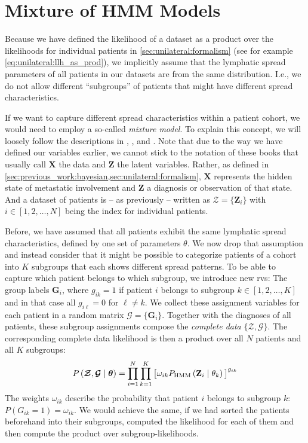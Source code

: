 \documentclass[\relativeRoot/main.tex]{subfiles}
\begin{document}
\section{Mixture of HMM Models}
\label{sec:future:mixture}

Because we have defined the likelihood of a dataset as a product over the likelihoods for individual patients in \cref{sec:unilateral:formalism} (see for example \cref{eq:unilateral:llh_as_prod}), we implicitly assume that the lymphatic spread parameters of all patients in our datasets are from the same distribution. I.e., we do not allow different ``subgroups'' of patients that might have different spread characteristics.

If we want to capture different spread characteristics within a patient cohort, we would need to employ a so-called \emph{mixture model}. To explain this concept, we will loosely follow the descriptions in , , and . Note that due to the way we have defined our variables earlier, we cannot stick to the notation of these books that usually call $\mathbf{X}$ the data and $\mathbf{Z}$ the latent variables. Rather, as defined in \cref{sec:previous_work:bayesian,sec:unilateral:formalism}, $\mathbf{X}$ represents the hidden state of metastatic involvement and $\mathbf{Z}$ a diagnosis or observation of that state. And a dataset of patients is -- as previously -- written as $\boldsymbol{\mathcal{Z}} = \{ \mathbf{Z}_i \}$ with $i \in [1, 2, \ldots, N]$ being the index for individual patients.

Before, we have assumed that all patients exhibit the same lymphatic spread characteristics, defined by one set of parameters $\theta$. We now drop that assumption and instead consider that it might be possible to categorize patients of a cohort into $K$ subgroups that each shows different spread patterns. To be able to capture which patient belongs to which subgroup, we introduce new \glspl{rv}: The group labels $\mathbf{G}_i$, where $g_{ik} = 1$ if patient $i$ belongs to subgroup $k \in [1,2, \ldots, K]$ and in that case all $g_{i\ell} = 0$ for $\ell \neq k$. We collect these assignment variables for each patient in a random matrix $\boldsymbol{\mathcal{G}} = \{ \mathbf{G}_i \}$. Together with the diagnoses of all patients, these subgroup assignments compose the \emph{complete data} $\{ \boldsymbol{\mathcal{Z}}, \boldsymbol{\mathcal{G}} \}$. The corresponding complete data likelihood is then a product over all $N$ patients and all $K$ subgroups:
%
\begin{equation} \label{eq:future:mixture:complete_llh}
    P \left( \boldsymbol{\mathcal{Z}}, \boldsymbol{\mathcal{G}} \mid \boldsymbol{\theta} \right) = \prod_{i=1}^N{ \prod_{k=1}^K{ \big[ \omega_{ik} P_\text{HMM} \left( \mathbf{Z}_i \mid \theta_k \right) \big]^{g_{ik}} } }
\end{equation}
%
The weights $\omega_{ik}$ describe the probability that patient $i$ belongs to subgroup $k$: $P \left( G_{ik} = 1 \right) = \omega_{ik}$. We would achieve the same, if we had sorted the patients beforehand into their subgroups, computed the likelihood for each of them and then compute the product over subgroup-likelihoods.
\end{document}
